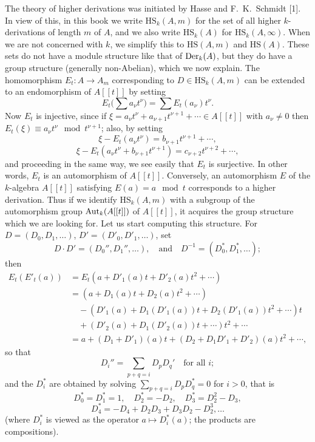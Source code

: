 The theory of higher derivations was initiated by Hasse and F.~K.~Schmidt [1].
In view of this, in this book we write $\mathrm{HS}_k(A, m)$ for the set of all higher
$k$-derivations of length $m$ of $A$, and we also write $\mathrm{HS}_k(A)$ for
$\mathrm{HS}_k(A, \infty)$. When we are not concerned with $k$, we simplify this to
$\mathrm{HS}(A, m)$ and $\mathrm{HS}(A)$. These sets do not have a module structure like that
of $\operatorname{Der}_k(A)$, but they do have a group structure (generally non-Abelian), which we
now explain. The homomorphism $E_t\colon A \to A_m$ corresponding to
$D \in \mathrm{HS}_k(A, m)$ can be extended to an endomorphism of $A[[t]]$ by setting
\[
  E_t\Big(\sum a_\nu t^\nu\Big) = \sum E_t(a_\nu)t^\nu.
\]
Now $E_t$ is injective, since if $\xi = a_\nu t^\nu + a_{\nu+1}t^{\nu+1} + \cdots \in A[[t]]$ with
$a_\nu \ne 0$ then $E_t(\xi) \equiv a_\nu t^\nu \mod t^{\nu+1}$; also, by setting
\[
  \xi - E_t(a_\nu t^\nu) = b_{\nu+1}t^{\nu+1} + \cdots,
\]
\[
  \xi - E_t(a_\nu t^\nu + b_{\nu+1}t^{\nu+1}) = c_{\nu+2}t^{\nu+2} + \cdots,
\]
and proceeding in the same way, we see easily that $E_t$ is surjective. In other
words, $E_t$ is an automorphism of $A[[t]]$. Conversely, an automorphism $E$ of the
$k$-algebra $A[[t]]$ satisfying $E(a) = a \mod t$ corresponds to a higher derivation. Thus
if we identify $\mathrm{HS}_k(A, m)$ with a subgroup of the automorphism group
$\operatorname{Aut}_k(A[[t]])$ of $A[[t]]$, it acquires the group structure which we are looking for.
Let us start computing this structure. For $D = (D_0, D_1, \ldots)$, $D' = (D'_0, D'_1, \ldots)$,
set
\[
  D \cdot D' = (D_0'', D_1'', \ldots), \quad \text{and} \quad D^{-1} = (D_0^*, D_1^*, \ldots);
\]
then
\begin{align*}
  E_t(E'_t(a)) &= E_t(a + D'_1(a)t + D'_2(a)t^2 + \cdots) \\
               &= (a + D_1(a)t + D_2(a)t^2 + \cdots) \\
               &\quad - (D'_1(a) + D_1(D'_1(a))t + D_2(D'_1(a))t^2 + \cdots)t \\
               &\quad + (D'_2(a) + D_1(D'_2(a))t + \cdots)t^2 + \cdots \\
               &= a + (D_1 + D'_1)(a)t + (D_2 + D_1D'_1 + D'_2)(a)t^2 + \cdots,
\end{align*}
so that
\[
  D_i'' = \sum_{p+q=i} D_pD_q' \quad \text{for all } i;
\]
and the $D_i^*$ are obtained by solving $\sum_{p+q=i} D_pD_q^* = 0$ for $i > 0$, that is
\[
  D_0^* = D_1^* = 1, \quad D_2^* = -D_2, \quad D_3^* = D_2^2 - D_3,
\]
\[
  D_4^* = -D_4 + D_2D_3 + D_3D_2 - D_2^3, \ldots
\]
(where $D_i^*$ is viewed as the operator $a \mapsto D_i^*(a)$; the products are
compositions).


